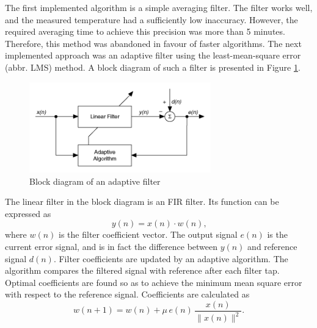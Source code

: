 \documentclass{standalone}
\begin{document}
The first implemented algorithm is a simple averaging filter. The filter works well, and the measured temperature had a sufficiently low inaccuracy. However, the required averaging time to achieve this precision was more than 5 minutes. Therefore, this method was abandoned in favour of faster algorithms. The next implemented approach was an adaptive filter using the least-mean-square error (abbr. LMS) method. A block diagram of such a filter is presented in Figure \ref{fig:lms_block}.
\begin{figure}[h]
	\centering
	\includegraphics[width=0.7\textwidth]{lms_block.png}
	\caption{Block diagram of an adaptive filter \cite{labview:filter}}
	\label{fig:lms_block}
\end{figure}
The linear filter in the block diagram is an FIR filter. Its function can be expressed as \cite{anc}\cite{mitlecture25}\cite{fer:dos}\cite{adaptivno0069}
\begin{equation}
y(n) = x(n) \cdot w(n) \textrm{,}
\end{equation}
where $w(n)$ is the filter coefficient vector. The output signal $e(n)$ is the current error signal, and is in fact the difference between $y(n)$ and reference signal $d(n)$. Filter coefficients are updated by an adaptive algorithm. The algorithm compares the filtered signal with reference after each filter tap. Optimal coefficients are found so as to achieve the minimum mean square error with respect to the reference signal. Coefficients are calculated as \cite{fer:spus}
\begin{equation} \label{eq:normalizedlms}
w(n+1) = w(n) + \mu \, e(n) \, \frac{x(n)}{\| x(n) \| ^2} \textrm{.}
\end{equation}
\end{document}
